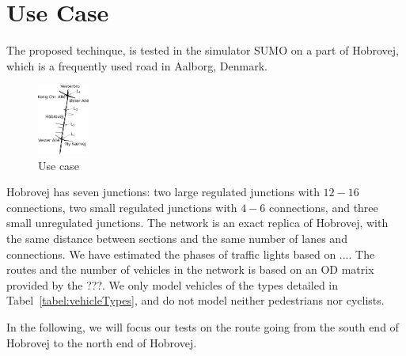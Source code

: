 \section{Use Case}
The proposed techinque, \tech is tested in the simulator SUMO on a part of Hobrovej, which is a frequently used road in Aalborg, Denmark.

\begin{figure}[htb]
\centering
\includegraphics[width=0.15\textwidth]{../images/Hobrovej.png}
\caption{Use case}
\label{fig:Introduction:hobro}
\end{figure}

Hobrovej has seven junctions: two large regulated junctions with $12-16$ connections, two small regulated junctions with $4-6$ connections, and three small unregulated junctions.
The network is an exact replica of Hobrovej, with the same distance between sections and the same number of lanes and connections. 
We have estimated the phases of traffic lights based on ....%
The routes and the number of vehicles in the network is based on an OD matrix provided by the ???.
We only model vehicles of the types detailed in Tabel~\ref{tabel:vehicleTypes}, and do not model neither pedestrians nor cyclists.

In the following, we will focus our tests on the route going from the south end of Hobrovej to the north end of Hobrovej. 
